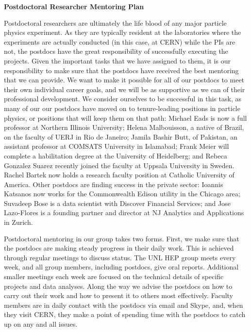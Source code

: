 \documentclass[11pt]{article}
\begin{document}
\begin{center}
{\large \bf Postdoctoral Researcher Mentoring Plan}\\
\end{center}

Postdoctoral researchers are ultimately the life blood of any major
particle physics experiment.  As they are typically resident at the
laboratories where the experiments are actually conducted (in this case, at
CERN) while the PIs are not, the postdocs have the great responsibility of
successfully executing the projects.  Given the important tasks that we
have assigned to them, it is our responsibility to make sure that the
postdocs have received the best mentoring that we can provide.  We want to
make it possible for all of our postdocs to meet their own individual
career goals, and we will be as supportive as we can of their professional
development.  We consider ourselves to be successful in this task, as many
of our our postdocs have moved on to tenure-leading positions in particle
physics, or positions that will keep them on that path: Michael Eads is now
a full professor at Northern Illinois University; Helena Malbouisson, a
native of Brazil, on the faculty of UERJ in Rio de Janeiro; Jamila Bashir
Butt, of Pakistan, an assistant professor at COMSATS University in
Islamabad; Frank Meier will complete a habilitation degree at the
University of Heidelberg; and Rebeca Gonzalez Suarez recently joined the
faculty at Uppsala University in Sweden.  Rachel Bartek now holds a
research faculty position at Catholic University of America.  Other
postdocs are finding success in the private sector: Ioannis Katsanos now
works for the Commonwealth Edison utility in the Chicago area; Suvadeep
Bose is a data scientist with Discover Financial Services; and Jose
Lazo-Flores is a founding partner and director at NJ Analytics and
Applications in Zurich.

Postdoctoral mentoring in our group takes two forms.  First, we make sure
that the postdocs are making steady progress in their daily work.  This is
achieved through regular meetings to discuss status.  The UNL HEP group
meets every week, and all group members, including postdocs, give oral
reports.  Additional smaller meetings each week are focused on the
technical details of specific projects and data analyses.  Along the way we
advise the postdocs on how to carry out their work and how to present it to
others most effectively.  Faculty members are in daily contact with the
postdocs via email and Skype, and, when they visit CERN, they
make a point of spending time with the postdocs to catch up on any and all
issues.
\end{document}
